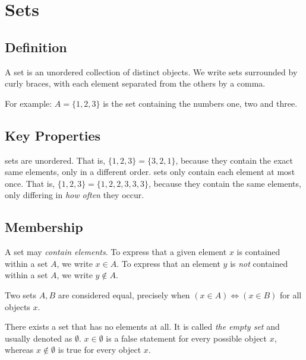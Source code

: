 \chapter{Sets}\label{ch:sets}
\section{Definition}
\begin{definition}
  A set is an unordered collection of distinct objects.
  We write sets surrounded by curly braces, with each element
  separated from the others by a comma.
\end{definition}
\begin{example}
  For example: \(A = \{1, 2, 3\}\) is the set
  containing the numbers one, two and three.
\end{example}

\section{Key Properties}
\begin{itemize}
   sets are unordered. That is, \(\{1,2,3\}=\{3,2,1\}\),
  because they contain the exact same elements, only in a different order.
   sets only contain each element at most once.
  That is, \(\{1,2,3\}=\{1,2,2,3,3,3\}\), because they contain the same
  elements, only differing in \emph{how often} they occur.
\end{itemize}

\section{Membership}
A set may \emph{contain elements}.
To express that a given element \(x\) is contained within a set \(A\),
we write \(x \in A\). To express that an element \(y\) is \emph{not} contained
within a set \(A\), we write \(y \notin A\).

Two sets \(A, B\) are considered equal, precisely when
\((x \in A) \Leftrightarrow (x \in B)\) for all objects \(x\).

There exists a set that has no elements at all. It is called \emph{the empty
  set} and usually denoted as \(\emptyset\).
\(x \in \emptyset\) is a false statement for every possible object \(x\),
whereas \(x \notin \emptyset\) is true for every object \(x\).

